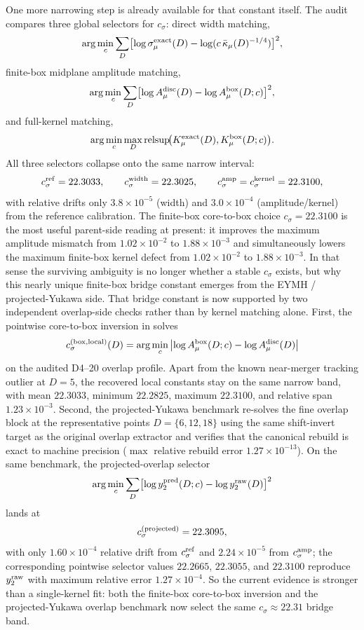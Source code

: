 \documentclass[aps,prd,onecolumn,notitlepage,nofootinbib,superscriptaddress,11pt,floatfix]{revtex4-2}
\begin{document}
One more narrowing step is already available for that constant itself. The audit  compares three global selectors for $c_\sigma$: direct width matching,
\[
\arg\min_c \sum_D \bigl[\log \sigma_\mu^{\rm exact}(D)-\log(c\,\bar\kappa_\mu(D)^{-1/4})\bigr]^2,
\]
finite-box midplane amplitude matching,
\[
\arg\min_c \sum_D \bigl[\log A_\mu^{\rm disc}(D)-\log A_\mu^{\rm box}(D;c)\bigr]^2,
\]
and full-kernel matching,
\[
\arg\min_c \max_D \operatorname{relsup}\!\bigl(K_\mu^{\rm exact}(D),K_\mu^{\rm box}(D;c)\bigr).
\]
All three selectors collapse onto the same narrow interval:
\[
c_\sigma^{\rm ref}=22.3033,\qquad
c_\sigma^{\rm width}=22.3025,\qquad
c_\sigma^{\rm amp}=c_\sigma^{\rm kernel}=22.3100,
\]
with relative drifts only $3.8\times10^{-5}$ (width) and $3.0\times10^{-4}$ (amplitude/kernel) from the reference calibration. The finite-box core-to-box choice $c_\sigma=22.3100$ is the most useful parent-side reading at present: it improves the maximum amplitude mismatch from $1.02\times10^{-2}$ to $1.88\times10^{-3}$ and simultaneously lowers the maximum finite-box kernel defect from $1.02\times10^{-2}$ to $1.88\times10^{-3}$. In that sense the surviving ambiguity is no longer whether a stable $c_\sigma$ exists, but why this nearly unique finite-box bridge constant emerges from the EYMH / projected-Yukawa side.
That bridge constant is now supported by two independent overlap-side checks rather than by kernel matching alone. First, the pointwise core-to-box inversion in  solves
\[
c_\sigma^{\rm(box,local)}(D)
=
\arg\min_c
\left|
\log A_\mu^{\rm box}(D;c)-\log A_\mu^{\rm disc}(D)
\right|
\]
on the audited D4--20 overlap profile. Apart from the known near-merger tracking outlier at $D=5$, the recovered local constants stay on the same narrow band, with mean $22.3033$, minimum $22.2825$, maximum $22.3100$, and relative span $1.23\times10^{-3}$. Second, the projected-Yukawa benchmark  re-solves the fine overlap block at the representative points $D=\{6,12,18\}$ using the same shift-invert target as the original overlap extractor and verifies that the canonical rebuild is exact to machine precision ($\max$ relative rebuild error $1.27\times10^{-13}$). On the same benchmark, the projected-overlap selector
\[
\arg\min_c \sum_D \bigl[\log y_2^{\rm pred}(D;c)-\log y_2^{\rm raw}(D)\bigr]^2
\]
lands at
\[
c_\sigma^{\rm(projected)}=22.3095,
\]
with only $1.60\times10^{-4}$ relative drift from $c_\sigma^{\rm ref}$ and $2.24\times10^{-5}$ from $c_\sigma^{\rm amp}$; the corresponding pointwise selector values $22.2665$, $22.3055$, and $22.3100$ reproduce $y_2^{\rm raw}$ with maximum relative error $1.27\times10^{-4}$. So the current evidence is stronger than a single-kernel fit: both the finite-box core-to-box inversion and the projected-Yukawa overlap benchmark now select the same $c_\sigma\approx 22.31$ bridge band.
\end{document}
